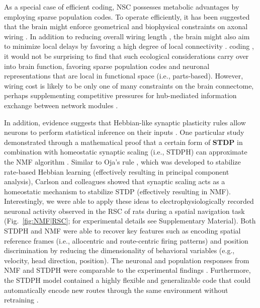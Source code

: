 As a special case of efficient coding,
\ac{NSC} possesses metabolic advantages by employing
sparse population codes.
To operate efficiently, it has been suggested that the brain might enforce 
geometrical and biophysical constraints on axonal wiring 
\cite{LaughlinSejnowski2003}.
In addition to reducing overall wiring length
\cite{Cherniak1994}, the brain might also aim to minimize local delays
by favoring a high degree of local connectivity
\cite{Chklovskii2002}.
 coding \cite{Clopath2010},
it would not be surprising to find that such ecological considerations
carry over into brain function,
favoring sparse population codes and neuronal representations that are
local in functional space (i.e., parts-based).
However, wiring cost is likely to be only one of many constraints 
on the brain connectome, perhaps supplementing competitive pressures
for hub-mediated information exchange between network modules
\cite{Rubinov2015}.

In addition, evidence suggests that Hebbian-like synaptic plasticity rules
allow neurons to perform statistical inference on their inputs
\cite{Nessler2009,Carlson2013,MorenoBoteDrugowitsch2015,Oja1982}.
One particular study demonstrated through a mathematical proof
that a certain form of \textbf{\ac{STDP}} in combination with 
homeostatic synaptic scaling (i.e., \ac{STDPH})
can approximate the \ac{NMF} algorithm
\cite{Carlson2013}.
Similar to Oja's rule \cite{Oja1982}, which was developed to stabilize 
rate-based Hebbian learning
(effectively resulting in principal component analysis),
Carlson and colleagues showed that synaptic scaling acts as a 
homeostatic mechanism to stabilize \ac{STDP}
(effectively resulting in \ac{NMF}).
Interestingly, we were able to apply these ideas to 
electrophysiologically recorded neuronal activity observed in the \ac{RSC}
of rats during a spatial navigation task (Fig.~\ref{fig:NMF|RSC}; for experimental details see Supplementary Material). Both \ac{STDPH} and \ac{NMF} were able to recover key  features such as encoding spatial reference frames (i.e., allocentric and route-centric firing patterns) and position discrimination by reducing the dimensionality of behavioral variables (e.g., velocity, head direction, position).
The neuronal and population responses from NMF and STDPH were comparable to the experimental findings \cite{AlexanderNitz2015}.
Furthermore, the \ac{STDPH} model contained a highly flexible and generalizable code
that could automatically encode new routes through the same environment
without retraining \cite{Rounds2018}.

